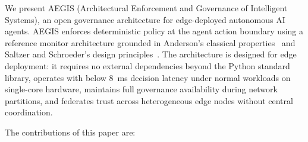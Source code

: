 \documentclass[journal]{IEEEtran}
\begin{document}
We present AEGIS (Architectural Enforcement and Governance of Intelligent Systems), an open governance architecture for edge-deployed autonomous AI agents. AEGIS enforces deterministic policy at the agent action boundary using a reference monitor architecture grounded in Anderson's classical properties~\cite{anderson1972} and Saltzer and Schroeder's design principles~\cite{saltzer1975}. The architecture is designed for edge deployment: it requires no external dependencies beyond the Python standard library, operates with below 8~ms decision latency under normal workloads on single-core hardware, maintains full governance availability during network partitions, and federates trust across heterogeneous edge nodes without central coordination.

The contributions of this paper are:
\end{document}
